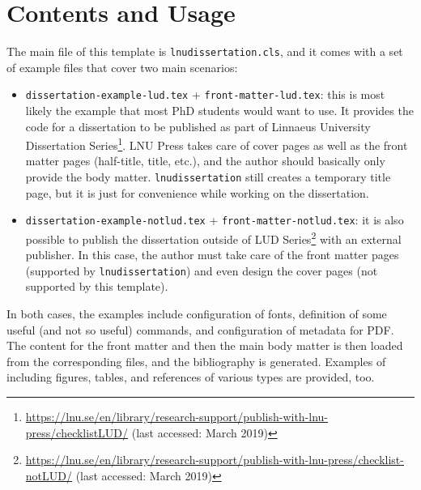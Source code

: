 \documentclass[10pt,a4paper]{article}
\begin{document}
\section{Contents and Usage}
The main file of this template is \texttt{lnudissertation.cls}, and it comes with a set of example files that cover two main scenarios:
\begin{itemize}
\item \texttt{dissertation-example-lud.tex} + \texttt{front-matter-lud.tex}: this is most likely the example that most PhD students would want to use. 
It provides the code for a dissertation to be published as part of Linnaeus University Dissertation Series\footnote{\url{https://lnu.se/en/library/research-support/publish-with-lnu-press/checklistLUD/} (last accessed: March 2019)}. 
LNU Press takes care of cover pages as well as the front matter pages (half-title, title, etc.), and the author should basically only provide the body matter. 
\texttt{lnudissertation} still creates a temporary title page, but it is just for convenience while working on the dissertation. 
\item \texttt{dissertation-example-notlud.tex} + \texttt{front-matter-notlud.tex}: it is also possible to publish the dissertation outside of LUD Series\footnote{\url{https://lnu.se/en/library/research-support/publish-with-lnu-press/checklist-notLUD/} (last accessed: March 2019)} with an external publisher. 
In this case, the author must take care of the front matter pages (supported by \texttt{lnudissertation}) and even design the cover pages (not supported by this template).
\end{itemize}

\noindent In both cases, the examples include configuration of fonts, definition of some useful (and not so useful) commands, and configuration of metadata for PDF. 
The content for the front matter and then the main body matter is then loaded from the corresponding files, and the bibliography is generated. 
Examples of including figures, tables, and references of various types are provided, too.
\end{document}
